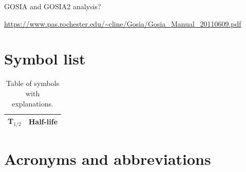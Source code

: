 \documentclass[twoside,english]{uiofysmaster/uiofysmaster}
\begin{document}
GOSIA and GOSIA2 analysis?

\url{https://www.pas.rochester.edu/~cline/Gosia/Gosia_Manual_20110609.pdf}






\begin{appendices}

\chapter{Symbol list}

\begin{table}[h]
  \centering
  \caption{Table of symbols with explanations.}
    \begin{tabular}{ll}
        \hline
        T$_{1/2}$ & Half-life \\
        \hline
    \end{tabular}
    \label{tab:symbols}
\end{table}


\chapter{Acronyms and abbreviations}


\end{appendices}
\end{document}

